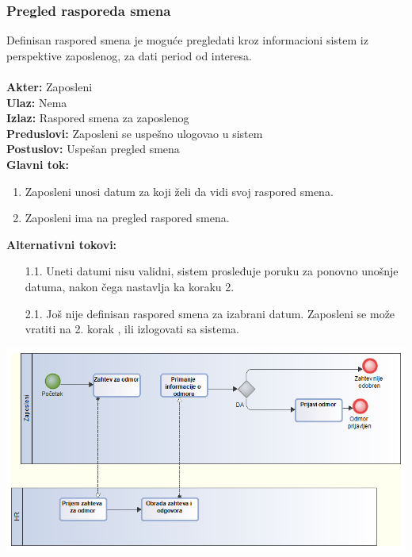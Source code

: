 \documentclass{article}
\begin{document}
\subsubsection{Pregled rasporeda smena}
Definisan raspored smena je moguće pregledati kroz informacioni sistem iz perspektive zaposlenog, za dati period od interesa.\\\\
\textbf{Akter:} Zaposleni\\
\textbf{Ulaz:} Nema\\
\textbf{Izlaz:} Raspored smena za zaposlenog\\
\textbf{Preduslovi:} Zaposleni se uspešno ulogovao u sistem\\
\textbf{Postuslov:} Uspešan pregled smena\\
\textbf{Glavni tok:}
\begin{enumerate}
\item Zaposleni unosi datum za koji želi da vidi svoj raspored smena.
\item Zaposleni ima na pregled raspored smena.
\end{enumerate}
\textbf{Alternativni tokovi:}\\
\begin{itemize}
\item [1.1.] Uneti datumi nisu validni, sistem prosleđuje poruku za ponovno unošnje datuma, nakon čega nastavlja ka koraku 2.
\item[2.1.] Još nije definisan raspored smena za izabrani datum. Zaposleni se može vratiti na 2. korak , ili izlogovati sa sistema.
\end{itemize}

\includegraphics[width=\textwidth]{SU_4_Odmor.png}\\

\end{document}
